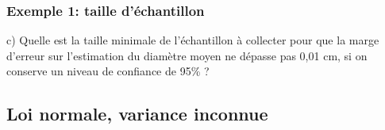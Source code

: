 \documentclass{BeamerTemplate}
\begin{document}


\begin{frame}[t] \frametitle{Exemple 1: taille d'échantillon}

 \alert{c)} Quelle est la taille minimale de l'échantillon à collecter pour que la marge d'erreur sur l'estimation du diamètre moyen ne dépasse pas 0,01 cm, si on conserve un niveau de confiance de 95\% ?


\end{frame}

\subsection{Loi normale, variance inconnue}
\end{document}
